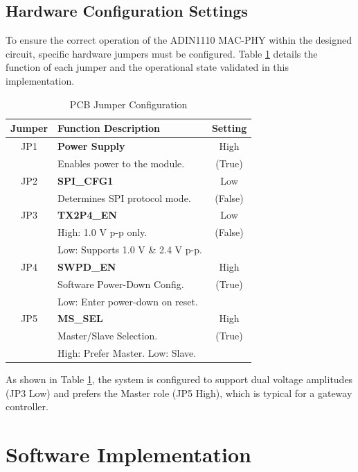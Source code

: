 \documentclass[conference]{IEEEtran}
\begin{document}
	\subsection{Hardware Configuration Settings}
	To ensure the correct operation of the ADIN1110 MAC-PHY within the designed circuit, specific hardware jumpers must be configured. Table \ref{tab:jumpers} details the function of each jumper and the operational state validated in this implementation.
	
	\begin{table}[htbp]
		\caption{PCB Jumper Configuration}
		\begin{center}
			\begin{tabular}{|c|l|c|}
				\hline
				\textbf{Jumper} & \textbf{Function Description} & \textbf{Setting} \\
				\hline
				JP1 & \textbf{Power Supply} & High \\
				& Enables power to the module. & (True) \\
				\hline
				JP2 & \textbf{SPI\_CFG1} & Low \\
				& Determines SPI protocol mode. & (False) \\
				\hline
				JP3 & \textbf{TX2P4\_EN} & Low \\
				& High: 1.0 V p-p only. & (False) \\
				& Low: Supports 1.0 V \& 2.4 V p-p. & \\
				\hline
				JP4 & \textbf{SWPD\_EN} & High \\
				& Software Power-Down Config. & (True) \\
				& Low: Enter power-down on reset. & \\
				\hline
				JP5 & \textbf{MS\_SEL} & High \\
				& Master/Slave Selection. & (True) \\
				& High: Prefer Master. Low: Slave. & \\
				\hline
			\end{tabular}
			\label{tab:jumpers}
		\end{center}
	\end{table}
	
	As shown in Table \ref{tab:jumpers}, the system is configured to support dual voltage amplitudes (JP3 Low) and prefers the Master role (JP5 High), which is typical for a gateway controller.
	
	\section{Software Implementation}
	
\end{document}
